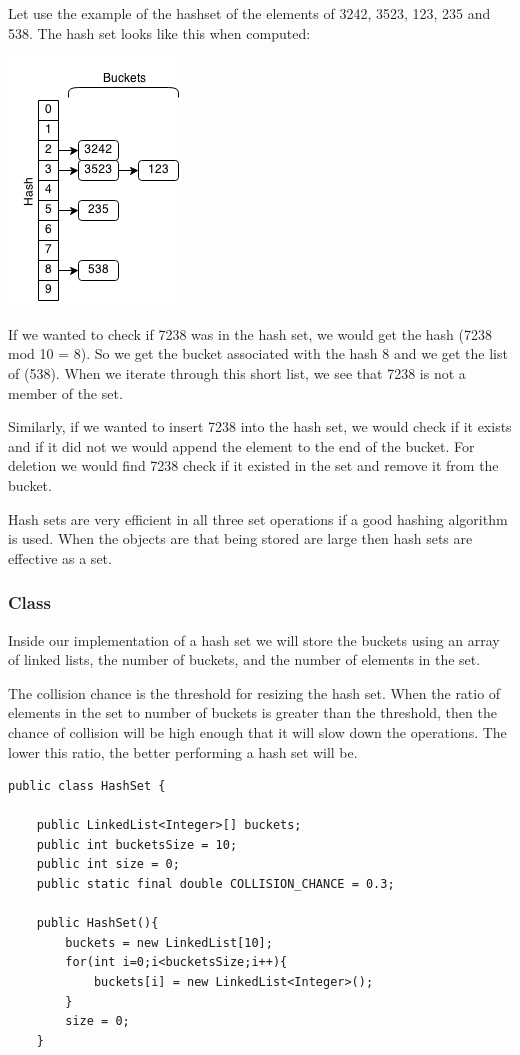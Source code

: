 \documentclass[11pt,oneside]{book}
\makeatletter
\def\maxwidth#1{\ifdim\Gin@nat@width>#1 #1\else\Gin@nat@width\fi}
\makeatother
\begin{document}
Let use the example of the hashset of the elements of 3242, 3523, 123, 235 and 538. The hash set looks like this when computed:

\vspace{5px}\includegraphics[width=\maxwidth{\textwidth}]{hashset.png}

If we wanted to check if 7238 was in the hash set, we would get the hash (7238 mod 10 = 8). So we get the bucket associated with the hash 8 and we get the list of (538). When we iterate through this short list, we see that 7238 is not a member of the set.

Similarly, if we wanted to insert 7238 into the hash set, we would check if it exists and if it did not we would append the element to the end of the bucket. For deletion we would find 7238 check if it existed in the set and remove it from the bucket.

Hash sets are very efficient in all three set operations if a good hashing algorithm is used. When the objects are that being stored are large then hash sets are effective as a set.

\subsubsection{Class}

Inside our implementation of a hash set we will store the buckets using an array of linked lists, the number of buckets, and the number of elements in the set.

The collision chance is the threshold for resizing the hash set. When the ratio of elements in the set to number of buckets is greater than the threshold, then the chance of collision will be high enough that it will slow down the operations. The lower this ratio, the better performing a hash set will be.

\begin{lstlisting}
public class HashSet {

    public LinkedList<Integer>[] buckets;
    public int bucketsSize = 10;
    public int size = 0;
    public static final double COLLISION_CHANCE = 0.3;
    
    public HashSet(){
        buckets = new LinkedList[10];
        for(int i=0;i<bucketsSize;i++){
            buckets[i] = new LinkedList<Integer>();
        }
        size = 0;
    }
\end{lstlisting}
\end{document}
